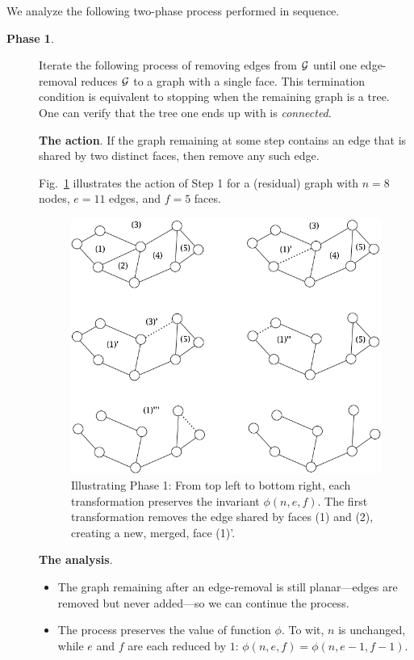 \noindent
We analyze the following two-phase process performed in sequence.
\begin{description}
\item[{\bf Phase 1}.]
Iterate the following process of removing edges from $\mbox{$\cal G$}$ until one
edge-removal reduces $\mbox{$\cal G$}$ to a graph with a single face.  This
termination condition is equivalent to stopping when the remaining
graph is a tree.  One can verify that the tree one ends up with is
{\em connected}.
\bigskip

{\bf The action}.
If the graph remaining at some step contains an edge that is shared by
two distinct faces, then remove any such edge.

Fig.~\ref{fig:planarStep1} illustrates the action of Step 1 for a
(residual) graph with $n=8$ nodes, $e=11$ edges, and $f=5$ faces.
\begin{figure}[hbt]
\begin{center}
   \includegraphics[scale=0.4]{FiguresGraph/planarStep1}
\caption{Illustrating Phase 1: From top left to bottom right, each
  transformation preserves the invariant $\phi(n,e,f)$.  The first
  transformation removes the edge shared by faces (1) and (2),
  creating a new, merged, face (1)'.}
  \label{fig:planarStep1}
\end{center}
\end{figure}

\bigskip

{\bf The analysis}.
\begin{itemize}
\item
The graph remaining after an edge-removal is still planar---edges are
removed but never added---so we can continue the process.
\item
The process preserves the value of function $\phi$.  To wit, $n$ is
unchanged, while $e$ and $f$ are each reduced by $1$: $\phi(n,e,f) =
\phi(n,e-1,f-1)$.
\end{itemize}


\end{description}
